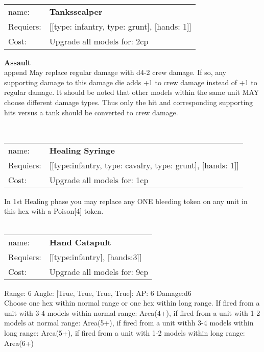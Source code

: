 \ \\
\begin{tabular}{ll}
name: & {\bf Tanksscalper } \\
Requiers: & [[type: infantry, type: grunt], [hands: 1]] \\
Cost: & Upgrade all models for: 2cp \\
\end{tabular}





{\bf Assault} \ \\

append May replace regular damage with d4-2 crew damage. If so, any supporting damage to this damage die adds +1 to crew damage instead of +1 to regular damage. It should be noted that other models within the same unit MAY choose different damage types. Thus only the hit and corresponding supporting hits versus a tank should be converted to crew damage.


\ \\
\begin{tabular}{ll}
name: & {\bf Healing Syringe } \\
Requiers: & [[type:infantry, type: cavalry, type: grunt], [hands: 1]] \\
Cost: & Upgrade all models for: 1cp \\
\end{tabular}

In 1st Healing phase you may replace any ONE bleeding token on any unit in this hex with a Poison[4] token.\\ 









\ \\
\begin{tabular}{ll}
name: & {\bf Hand Catapult } \\
Requiers: & [[type:infantry], [hands:3]] \\
Cost: & Upgrade all models for: 9cp \\
\end{tabular}



Range: 6  Angle: [True, True, True, True]: AP: 6 Damage:d6 \\
Choose one hex within normal range or one hex within long range. If fired from a unit with 3-4 models within normal range: Area(4+), if fired from a unit with 1-2 models at normal range: Area(5+), if fired from a unit withh 3-4 models within long range: Area(5+), if fired from a unit with 1-2 models within long range: Area(6+)\\ 








